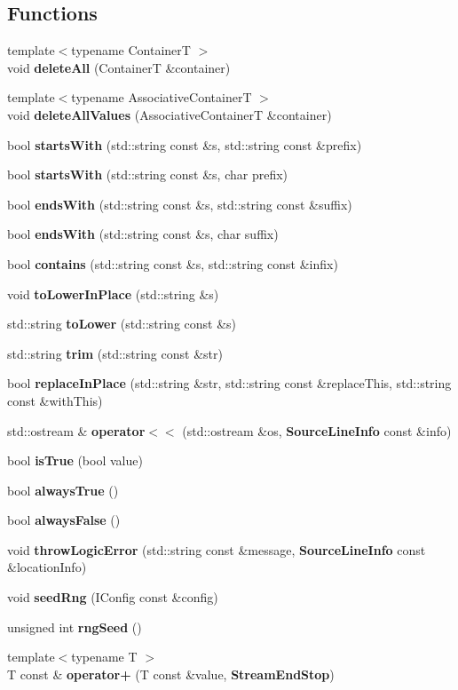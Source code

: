 \subsection*{Functions}
\begin{DoxyCompactItemize}
\item 
{\footnotesize template$<$typename ContainerT $>$ }\\void \textbf{ delete\+All} (ContainerT \&container)
\item 
{\footnotesize template$<$typename Associative\+ContainerT $>$ }\\void \textbf{ delete\+All\+Values} (Associative\+ContainerT \&container)
\item 
bool \textbf{ starts\+With} (std\+::string const \&s, std\+::string const \&prefix)
\item 
bool \textbf{ starts\+With} (std\+::string const \&s, char prefix)
\item 
bool \textbf{ ends\+With} (std\+::string const \&s, std\+::string const \&suffix)
\item 
bool \textbf{ ends\+With} (std\+::string const \&s, char suffix)
\item 
bool \textbf{ contains} (std\+::string const \&s, std\+::string const \&infix)
\item 
void \textbf{ to\+Lower\+In\+Place} (std\+::string \&s)
\item 
std\+::string \textbf{ to\+Lower} (std\+::string const \&s)
\item 
std\+::string \textbf{ trim} (std\+::string const \&str)
\item 
bool \textbf{ replace\+In\+Place} (std\+::string \&str, std\+::string const \&replace\+This, std\+::string const \&with\+This)
\item 
std\+::ostream \& \textbf{ operator$<$$<$} (std\+::ostream \&os, \textbf{ Source\+Line\+Info} const \&info)
\item 
bool \textbf{ is\+True} (bool value)
\item 
bool \textbf{ always\+True} ()
\item 
bool \textbf{ always\+False} ()
\item 
void \textbf{ throw\+Logic\+Error} (std\+::string const \&message, \textbf{ Source\+Line\+Info} const \&location\+Info)
\item 
void \textbf{ seed\+Rng} (I\+Config const \&config)
\item 
unsigned int \textbf{ rng\+Seed} ()
\item 
{\footnotesize template$<$typename T $>$ }\\T const  \& \textbf{ operator+} (T const \&value, \textbf{ Stream\+End\+Stop})

\end{DoxyCompactItemize}
